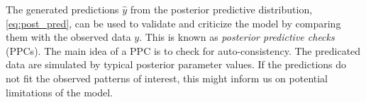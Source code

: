 The generated predictions $\hat{y}$ from the posterior predictive distribution, \autoref{eq:post_pred}, can be used to validate and criticize the model by comparing them with the observed data $y$. This is known as \textit{posterior predictive checks} (PPCs). The main idea of a PPC is to check for auto-consistency. The predicated data are simulated by typical posterior parameter values. If the predictions do not fit the observed patterns of interest, this might inform us on potential limitations of the model.  












